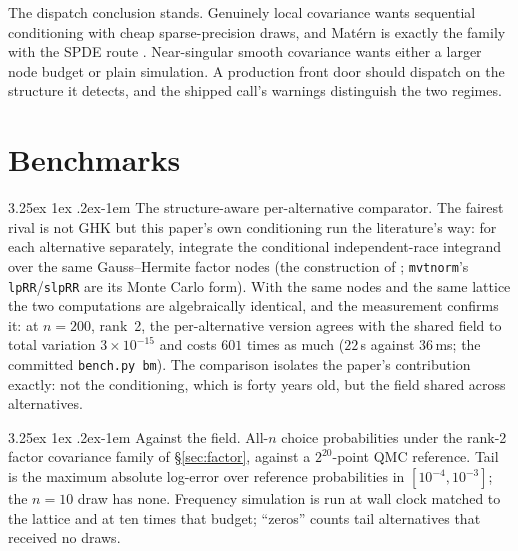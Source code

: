 \documentclass[11pt]{article}
\makeatletter
\renewcommand\paragraph{\@startsection{paragraph}{4}{\z@}%
  {3.25ex \@plus1ex \@minus.2ex}{-1em}%
  {\normalfont\normalsize\itshape}}
\makeatother
\begin{document}
The dispatch conclusion stands. Genuinely local covariance wants
sequential conditioning with cheap sparse-precision draws, and Mat\'ern
is exactly the family with the SPDE route \citep{lindgren2011}.
Near-singular smooth covariance wants either a larger node budget or
plain simulation. A production front door should dispatch on the
structure it detects, and the shipped call's warnings distinguish the two
regimes.

\section{Benchmarks}\label{sec:num}

\paragraph{The structure-aware per-alternative comparator.} The fairest
rival is not GHK but this paper's own conditioning run the literature's
way: for each alternative separately, integrate the conditional
independent-race integrand over the same Gauss--Hermite factor nodes
(the construction of \citet{butler1982}; \texttt{mvtnorm}'s
\texttt{lpRR}/\texttt{slpRR} are its Monte Carlo form). With the same
nodes and the same lattice the two computations are algebraically
identical, and the measurement
confirms it: at $n=200$, rank~2, the per-alternative
version agrees with the shared field to total variation
$3\times10^{-15}$ and costs $601$ times as much ($22$\,s against
$36$\,ms; the committed \texttt{bench.py bm}). The comparison isolates
the paper's contribution exactly: not the conditioning, which is forty
years old, but the field shared across alternatives.

\paragraph{Against the field.} All-$n$ choice probabilities under the rank-2
factor covariance family of \S\ref{sec:factor}, against a
$2^{20}$-point QMC reference. Tail is the maximum absolute log-error over
reference probabilities in $[10^{-4},10^{-3}]$; the $n=10$ draw has none.
Frequency simulation is run at wall clock matched to the lattice and at ten
times that budget; ``zeros'' counts tail alternatives that received no draws.
\end{document}
